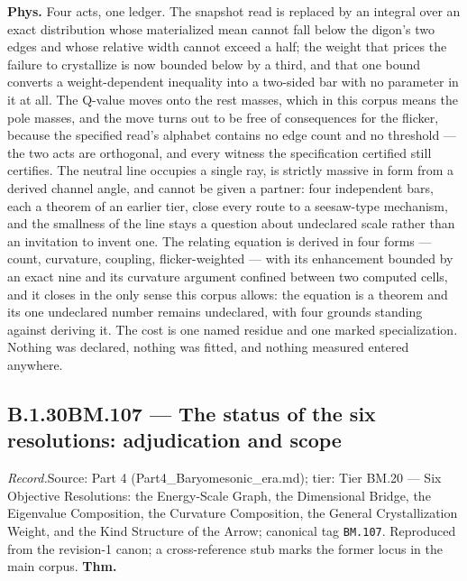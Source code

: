 \documentclass[11pt,openany]{report}
\theoremstyle{canonplain}
\theoremstyle{canondef}
\begin{document}
\textbf{Phys.} Four acts, one ledger. The snapshot read is replaced by an integral over an exact distribution whose materialized mean cannot fall below the digon's two edges and whose relative width cannot exceed a half; the weight that prices the failure to crystallize is now bounded below by a third, and that one bound converts a weight-dependent inequality into a two-sided bar with no parameter in it at all. The Q-value moves onto the rest masses, which in this corpus means the pole masses, and the move turns out to be free of consequences for the flicker, because the specified read's alphabet contains no edge count and no threshold — the two acts are orthogonal, and every witness the specification certified still certifies. The neutral line occupies a single ray, is strictly massive in form from a derived channel angle, and cannot be given a partner: four independent bars, each a theorem of an earlier tier, close every route to a seesaw-type mechanism, and the smallness of the line stays a question about undeclared scale rather than an invitation to invent one. The relating equation is derived in four forms — count, curvature, coupling, flicker-weighted — with its enhancement bounded by an exact nine and its curvature argument confined between two computed cells, and it closes in the only sense this corpus allows: the equation is a theorem and its one undeclared number remains undeclared, with four grounds standing against deriving it. The cost is one named residue and one marked specialization. Nothing was declared, nothing was fitted, and nothing measured entered anywhere.

\medskip
\subsection*{\texorpdfstring{B.1.30\quad BM.107 — The status of the six resolutions: adjudication and scope}{BM.107 B.1.30}}
\label{tag:BM-107}
{\small \textit{Record.}\quad Source: Part 4 (Part4\_Baryomesonic\_era.md); tier: Tier BM.20 — Six Objective Resolutions: the Energy-Scale Graph, the Dimensional Bridge, the Eigenvalue Composition, the Curvature Composition, the General Crystallization Weight, and the Kind Structure of the Arrow; canonical tag \texttt{BM.107}. Reproduced from the revision-1 canon; a cross-reference stub marks the former locus in the main corpus.}
\medskip
\textbf{Thm.}
\end{document}
